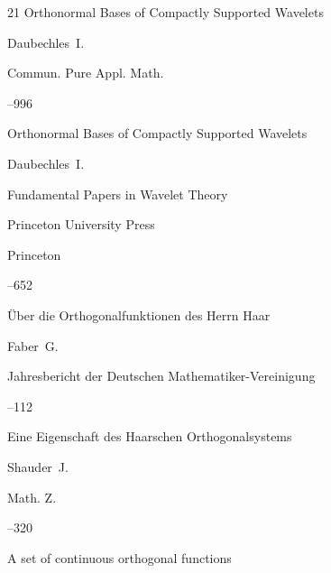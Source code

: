 \begin{thebibliography}{21}
\paper  Orthonormal Bases of Compactly Supported Wavelets 

\by Daubechles~I.

\jour Commun. Pure Appl. Math. 




--996


\moreref

\paper  Orthonormal Bases of Compactly Supported Wavelets 

\by Daubechles~I.

\inbook Fundamental Papers in Wavelet Theory

\publ Princeton University Press

\publaddr Princeton 


–652








\paper \"Uber die Orthogonalfunktionen des Herrn Haar

\by Faber~G.

\jour Jahresbericht der Deutschen Mathematiker-Vereinigung



--112






\paper Eine Eigenschaft des Haarschen Orthogonalsystems 

\by Shauder~J.

\jour Math. Z. 




--320





\paper A set of continuous orthogonal functions 


\end{thebibliography}
